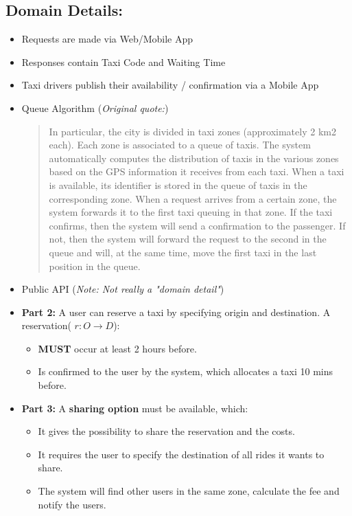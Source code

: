 \subsection{Domain Details:} \begin{itemize}
\item Requests are made via Web/Mobile App
\item Responses contain Taxi Code and Waiting Time 
\item Taxi drivers publish their availability / confirmation via a Mobile App
\item Queue Algorithm (\textit{Original quote:}) 
\begin{quote}
In	particular,	the	city	is	
divided	in	 taxi	 zones	 (approximately	 2	 km2 each).	 Each	 zone	is	associated	 to	a	
queue	of	taxis.	The	system	automatically	computes	the	distribution	of	taxis	in	the	
various	zones	based	on	 the	GPS	information	it	receives	 from	each	 taxi.	When	a	
taxi	is	available,	its	identifier	is	stored	in	the	queue	of	taxis	in	the	corresponding	
zone.		
When	a	 request	arrives	 from	a	certain	zone,	 the	system	 forwards	it	 to	 the	 first	
taxi	 queuing	 in	 that	 zone.	 If	 the	 taxi	 confirms,	 then	 the	 system	 will	 send	 a	
confirmation	to	the	passenger.	If	not,	then	the	system	will	forward	the	request	to	
the	second	in	the	queue	and	will,	at	the	same	time,	move	the	first	taxi	in	the	last	
position	in	the	queue.
\end{quote}
\item Public API (\textit{Note: Not really a "domain detail"})
\item \textbf{Part 2:} A user can reserve a taxi by specifying origin and destination.
    A reservation( $ r:O \rightarrow D  $):
    \begin{itemize}
\item \textbf{MUST} occur at least 2 hours before.
\item Is confirmed to the user by the system, which allocates a taxi 10 mins before.
\end{itemize}
\item \textbf{Part 3:} A \textbf{sharing option} must be available, which:
\begin{itemize}
\item It gives the possibility to share the reservation and the costs.
\item It requires the user to specify the destination of all rides it wants to share.
\item The system will find other users in the same zone, calculate the fee and notify the users.
\end{itemize}
\end{itemize}


